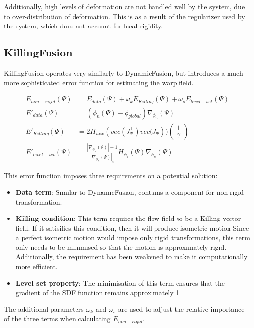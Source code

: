\documentclass[a4paper]{article}
\begin{document}
Additionally, high levels of deformation are not handled well by the system, due to over-distribution of deformation. This is as a result of the regularizer used by the system, which does not account for local rigidity.


\subsection{KillingFusion}

KillingFusion operates very similarly to DynamicFusion, but introduces a much more sophisticated error function for estimating the warp field.

\begin{align*}
E_{non-rigid}(\Psi) &= E_{data}(\Psi) + \omega_kE_{Killing}(\Psi) + \omega_sE_{level-set}(\Psi)\\
E'_{data}(\Psi) &= (\phi_n(\Psi) - \phi_{global}) \nabla_{\phi_n}(\Psi)\\
E'_{Killing}(\Psi) &= 2H_{uvw}(vec(J^{\top}_{\Psi}) vec\big(J_{\Psi})\big)\begin{pmatrix}1\\\gamma \end{pmatrix}\\
E'_{level-set}(\Psi) &= \frac{|\nabla_{\phi_n}(\Psi)| - 1}{|\nabla_{\phi_n}(\Psi)|_\epsilon}H_{\phi_n}(\Psi)\nabla_{\phi_n}(\Psi)
\end{align*}

This error function imposes three requirements on a potential solution:
\begin{itemize}
\item \textbf{Data term}: Similar to DynamicFusion, contains a component for non-rigid transformation. 
\item \textbf{Killing condition}: This term requires the flow field to be a Killing vector field. If it satisifies this condition, then it will produce isometric motion Since a perfect isometric motion would impose only rigid transformations, this term only needs to be minimised so that the motion is approximately rigid. Additionally, the requirement has been weakened to make it computationally more efficient.
\item \textbf{Level set property}: The minimisation of this term ensures that the gradient of the SDF function remains approximately 1
\end{itemize}

The additional parameters $\omega_k$ and $\omega_s$ are used to adjust the relative importance of the three terms when calculating $E_{non-rigid}$.
\end{document}
